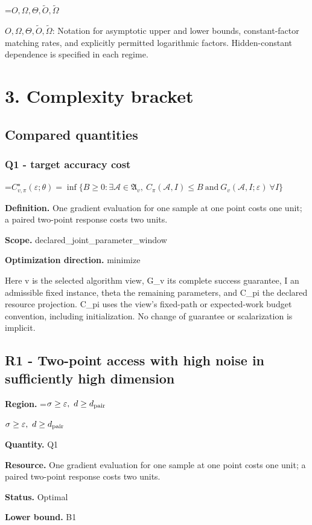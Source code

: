 \documentclass[10pt,a4paper]{article}
\newcommand{\AtlasMath}[1]{\par\begingroup\centering\setbox0=\hbox{$\displaystyle #1$}\ifdim\wd0>1.4\linewidth\typeout{ATLAS WIDE FORMULA: \the\wd0}\fi\ifdim\wd0>\linewidth\resizebox{\linewidth}{!}{\box0}\else\box0\fi\par\endgroup}
\newcommand{\AtlasInlineMath}[1]{\begingroup\setbox0=\hbox{$#1$}\ifdim\wd0>.4\linewidth\endgroup\AtlasMath{#1}\else\endgroup$#1$\fi}
\begin{document}
\AtlasInlineMath{O,\Omega,\Theta,\widetilde{O},\widetilde\Omega}: Notation for asymptotic upper and lower bounds, constant-factor matching rates, and explicitly permitted logarithmic factors. Hidden-constant dependence is specified in each regime.

\section{3. Complexity bracket}
\subsection{Compared quantities}
\subsubsection{Q1 - target accuracy cost}
\AtlasMath{C^\star_{v,\pi}(\varepsilon;\theta)=\inf\{B\ge0:\exists\mathcal A\in\mathfrak A_v,\ C_\pi(\mathcal A,I)\le B\ \text{and}\ G_v(\mathcal A,I;\varepsilon)\ \forall I\}}
\textbf{Definition.} One gradient evaluation for one sample at one point costs one unit; a paired two-point response costs two units.

\textbf{Scope.} declared\_joint\_parameter\_window

\textbf{Optimization direction.} minimize

Here v is the selected algorithm view, G\_v its complete success guarantee, I an admissible fixed instance, theta the remaining parameters, and C\_pi the declared resource projection. C\_pi uses the view's fixed-path or expected-work budget convention, including initialization. No change of guarantee or scalarization is implicit.

\subsection{R1 - Two-point access with high noise in sufficiently high dimension}
\textbf{Region.} \AtlasInlineMath{\sigma\ge\varepsilon,\ d\ge d_{\rm pair}}

\textbf{Quantity.} Q1

\textbf{Resource.} One gradient evaluation for one sample at one point costs one unit; a paired two-point response costs two units.

\textbf{Status.} Optimal

\textbf{Lower bound.} B1
\end{document}
